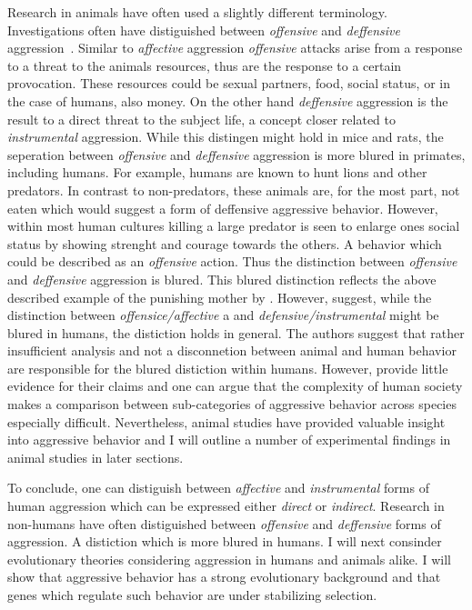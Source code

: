 Research in animals have often used a slightly different terminology.
Investigations often have distiguished between \textit{offensive} and \textit{deffensive} aggression~\cite{Blanchard2005b}.
Similar to \textit{affective} aggression \textit{offensive} attacks arise from a response to a threat to the animals resources, thus are the response to a certain provocation.
These resources could be sexual partners, food, social status, or in the case of humans, also money.
On the other hand \textit{deffensive} aggression is the result to a direct threat to the subject life, a concept closer related to \textit{instrumental} aggression.
While this distingen might hold in mice and rats, the seperation between \textit{offensive} and \textit{deffensive} aggression is more blured in primates, including humans.
For example, humans are known to hunt lions and other predators.
In contrast to non-predators, these animals are, for the most part, not eaten which would suggest a form of deffensive aggressive behavior.
However, within most human cultures killing a large predator is seen to enlarge ones social status by showing strenght and courage towards the others.
A behavior which could be described as an \textit{offensive} action.
Thus the distinction between \textit{offensive} and \textit{deffensive} aggression is blured.
This blured distinction reflects the above described example of the punishing mother by \citet{Geen2001}.
However, \citet{Blanchard2005b} suggest, while the distinction between \textit{offensice/affective} a and \textit{defensive/instrumental} might be blured in humans, the distiction holds in general.
The authors suggest that rather insufficient analysis and not a disconnetion between animal and human behavior are responsible for the blured distiction within humans.
However, \citet{Blanchard2005b} provide little evidence for their claims and one can argue that the complexity of human society makes a comparison between sub-categories of aggressive behavior across species especially difficult. 
Nevertheless, animal studies have provided valuable insight into aggressive behavior and I will outline a number of experimental findings in animal studies in later sections.

To conclude, one can distiguish between \textit{affective} and \textit{instrumental} forms of human aggression which can be expressed either \textit{direct} or \textit{indirect}.
Research in non-humans have often distiguished between \textit{offensive} and \textit{deffensive} forms of aggression.
A distiction which is more blured in humans.
I will next consinder evolutionary theories considering aggression in humans and animals alike.
I will show that aggressive behavior has a strong evolutionary background and that genes which regulate such behavior are under stabilizing selection.

